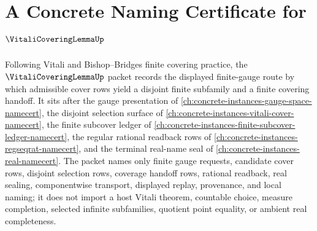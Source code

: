 \chapter{A Concrete Naming Certificate for $\VitaliCoveringLemmaUp$}
\label{ch:concrete-instances-vitali-covering-lemma-namecert}

Following Vitali and Bishop--Bridges finite covering practice, the $\VitaliCoveringLemmaUp$ packet records the displayed finite-gauge route by which admissible cover rows yield a disjoint finite subfamily and a finite covering handoff. It sits after the gauge presentation of \autoref{ch:concrete-instances-gauge-space-namecert}, the disjoint selection surface of \autoref{ch:concrete-instances-vitali-cover-namecert}, the finite subcover ledger of \autoref{ch:concrete-instances-finite-subcover-ledger-namecert}, the regular rational readback rows of \autoref{ch:concrete-instances-regseqrat-namecert}, and the terminal real-name seal of \autoref{ch:concrete-instances-real-namecert}. The packet names only finite gauge requests, candidate cover rows, disjoint selection rows, coverage handoff rows, rational readback, real sealing, componentwise transport, displayed replay, provenance, and local naming; it does not import a host Vitali theorem, countable choice, measure completion, selected infinite subfamilies, quotient point equality, or ambient real completeness.

